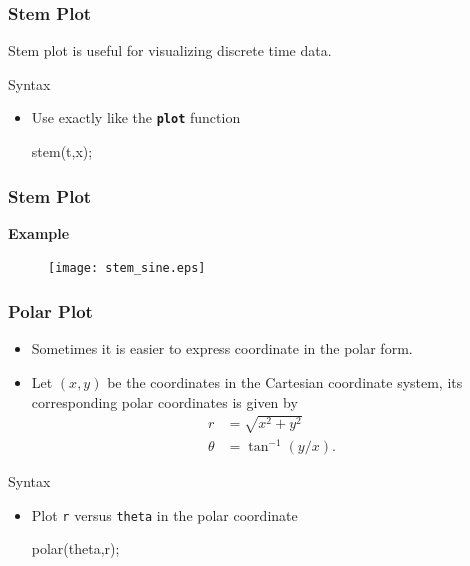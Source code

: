 \documentclass[compress]{beamer}  %
\newcommand{\tttbf}[1]{\texttt{\textbf{#1}}} %
\begin{document}
\begin{frame}[fragile]
\frametitle{Stem Plot}
Stem plot is useful for visualizing discrete time data.

\begin{block}{Syntax}
\begin{itemize}
    \item Use exactly like the \tttbf{plot} function
          \begin{matlabcodebeamer}[numbers=none,frame=none]
          stem(t,x);
          \end{matlabcodebeamer}
\end{itemize}
\end{block}

\end{frame}
\begin{frame}[fragile]
\frametitle{Stem Plot}
\textbf{Example} 

\setcounter{subfigure}{0}
\begin{figure}
    \centering
    \texttt{[image: stem\_sine.eps]}
\end{figure}

\end{frame}
\begin{frame}[fragile]
\frametitle{Polar Plot}
\begin{itemize}[<+->]
    \item Sometimes it is easier to express coordinate in the polar form.
    \item Let $(x,y)$ be the coordinates in the Cartesian coordinate system, its corresponding polar coordinates is given by
\begin{align}
    r      &= \sqrt{x^2 + y^2} \\
    \theta &= \tan^{-1}(y/x).
\end{align}
\end{itemize}

\pause
\begin{block}{Syntax}
\begin{itemize}
    \item Plot \texttt{r} versus \texttt{theta} in the polar coordinate
          \begin{matlabcodebeamer}[numbers=none,frame=none]
          polar(theta,r);
          \end{matlabcodebeamer}
\end{itemize}
\end{block}

\end{frame}
\end{document}

